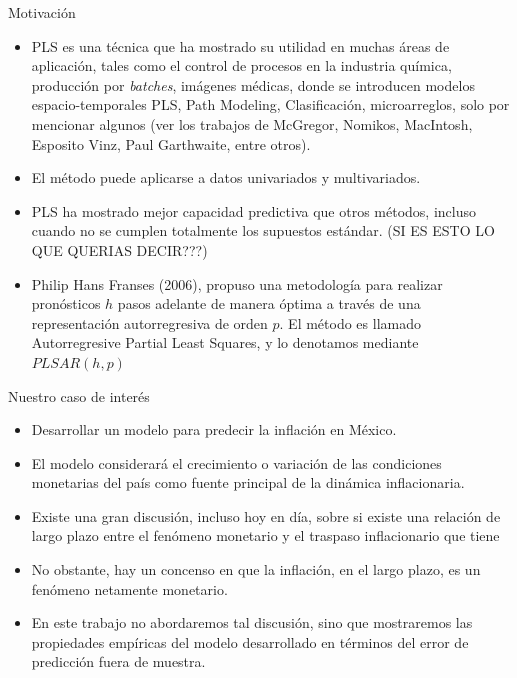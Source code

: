 \documentclass{beamer}
\newcommand{\?}{?`}
\begin{document}
\begin{frame}{Motivaci\'on}
  \begin{itemize}
    \item PLS es una t\'ecnica que ha mostrado su utilidad en muchas
      \'areas de aplicaci\'on, tales como el control de procesos en la
      industria qu\'imica, producci\'on por \emph{batches}, im\'agenes
      m\'edicas, donde se introducen modelos espacio-temporales PLS,
      Path Modeling, Clasificaci\'on, microarreglos, solo por
      mencionar algunos (ver los trabajos de McGregor, Nomikos,
      MacIntosh, Esposito Vinz, Paul Garthwaite, entre otros).
    \item El m\'etodo puede aplicarse a datos univariados y
      multivariados.
    \item PLS ha mostrado mejor capacidad predictiva que otros
      m\'etodos, incluso cuando no se cumplen totalmente los supuestos
      est\'andar. (SI ES ESTO LO QUE QUERIAS DECIR???)
    \item Philip Hans Franses (2006), propuso una metodolog\'ia para
      realizar pron\'osticos $h$ pasos adelante de manera \'optima a
      trav\'es de una representaci\'on autorregresiva de orden $p$. El
      m\'etodo es llamado Autorregresive Partial Least Squares, y lo
      denotamos mediante $PLSAR(h,p)$
  \end{itemize}
\end{frame}

\begin{frame}{Nuestro caso de inter\'es}
  \begin{itemize}
    \item Desarrollar un modelo para predecir la inflaci\'on en M\'exico.
    \item El modelo considerar\'a el crecimiento o variaci\'on de las
      condiciones monetarias del pa\'is como fuente principal de la
      din\'amica inflacionaria.
    \item Existe una gran discusi\'on, incluso hoy en d\'ia, sobre si
      existe una relaci\'on de largo plazo entre el fen\'omeno
      monetario y el traspaso inflacionario que tiene
    \item No obstante, hay un concenso en que la inflaci\'on, en el
      largo plazo, es un fen\'omeno netamente monetario.
    \item En este trabajo no abordaremos tal discusi\'on, sino que
      mostraremos las propiedades emp\'iricas del modelo desarrollado
      en t\'erminos del error de predicci\'on fuera de muestra.
  \end{itemize}
\end{frame}
\end{document}
